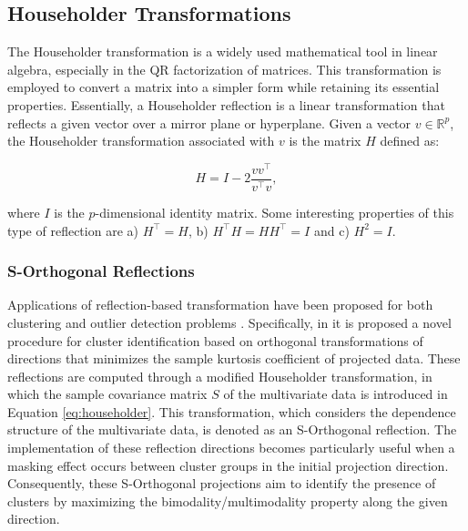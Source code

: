 \documentclass[12pt]{article}
\begin{document}
\subsection{Householder Transformations}\label{sec:Hh}

The Householder transformation \citep{householder1958} is a widely used mathematical tool in linear algebra, especially in the QR factorization of matrices. This transformation is employed to convert a matrix into a simpler form while retaining its essential properties. Essentially, a Householder reflection is a linear transformation that reflects a given vector over a mirror plane or hyperplane. Given a vector $v\in\mathbb{R}^p$, the Householder transformation associated with $v$ is the matrix $H$ defined as:

\begin{equation}\label{eq:householder}
    H = I - 2 \frac{v v^\top}{v^\top v},
\end{equation}

where $I$ is the $p$-dimensional identity matrix. Some interesting properties of this type of reflection are a) $H^\top = H$, b) $H^\top H = HH^\top = I$ and c) $H^2 = I$.




\subsubsection*{S-Orthogonal Reflections}

Applications of reflection-based transformation have been proposed for both clustering and outlier detection problems \cite{DanielPeñaandFranciscoJPrieto2001, PeñaPrieto2007}. Specifically, in \citet{DanielPeñaandFranciscoJPrieto2001} it is proposed a novel procedure for cluster identification based on orthogonal transformations of directions that minimizes the sample kurtosis coefficient of projected data. These reflections are computed through a modified Householder transformation, in which the sample covariance matrix $S$ of the multivariate data is introduced in Equation \eqref{eq:householder}. This transformation, which considers the dependence structure of the multivariate data, is denoted as an S-Orthogonal reflection. The implementation of these reflection directions becomes particularly useful when a masking effect occurs between cluster groups in the initial projection direction. Consequently, these S-Orthogonal projections aim to identify the presence of clusters by maximizing the bimodality/multimodality property along the given direction.\\
\end{document}
